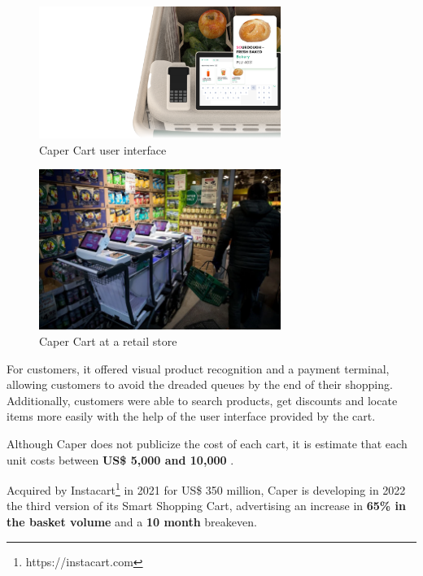 \documentclass[openright]{normas-utf-tex} %
\begin{document}
\begin{figure}[H]
	\centering
	\includegraphics[width=0.7\textwidth]{./images/capercartui.png}
	\caption[Caper Cart user interface]{Caper Cart user interface}
	\label{fig:caperui}
\end{figure}

\begin{figure}[H]
	\centering
	\includegraphics[width=0.7\textwidth]{./images/caper.png}
	\caption[Caper Cart at a retail store]{Caper Cart at a retail store}
	\label{fig:caperatretail}
\end{figure}

For customers, it offered visual product recognition and a payment terminal,
allowing customers to avoid the dreaded queues by the end of their shopping.
Additionally, customers were able to search products, get discounts and locate
items more easily with the help of the user interface provided by the cart.

Although Caper does not publicize the cost of each cart, it is estimate that each unit costs between
\textbf{US\$ 5,000 and 10,000} \cite{TWP2021}.

Acquired by Instacart\footnote{https://instacart.com} in 2021 for US\$ 350 million, Caper is developing in 2022 the 
third version of its Smart Shopping Cart, advertising an increase in \textbf{65\% in the basket
volume} and a \textbf{10 month} breakeven.
\end{document}
